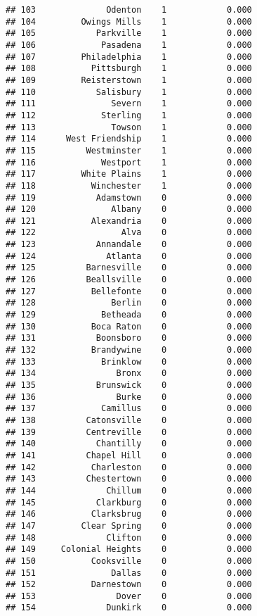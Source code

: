 \documentclass[]{article}
\begin{document}
\begin{verbatim}
## 103              Odenton    1            0.000
## 104         Owings Mills    1            0.000
## 105            Parkville    1            0.000
## 106             Pasadena    1            0.000
## 107         Philadelphia    1            0.000
## 108           Pittsburgh    1            0.000
## 109         Reisterstown    1            0.000
## 110            Salisbury    1            0.000
## 111               Severn    1            0.000
## 112             Sterling    1            0.000
## 113               Towson    1            0.000
## 114      West Friendship    1            0.000
## 115          Westminster    1            0.000
## 116             Westport    1            0.000
## 117         White Plains    1            0.000
## 118           Winchester    1            0.000
## 119            Adamstown    0            0.000
## 120               Albany    0            0.000
## 121           Alexandria    0            0.000
## 122                 Alva    0            0.000
## 123            Annandale    0            0.000
## 124              Atlanta    0            0.000
## 125          Barnesville    0            0.000
## 126          Beallsville    0            0.000
## 127           Bellefonte    0            0.000
## 128               Berlin    0            0.000
## 129             Betheada    0            0.000
## 130           Boca Raton    0            0.000
## 131            Boonsboro    0            0.000
## 132           Brandywine    0            0.000
## 133             Brinklow    0            0.000
## 134                Bronx    0            0.000
## 135            Brunswick    0            0.000
## 136                Burke    0            0.000
## 137             Camillus    0            0.000
## 138          Catonsville    0            0.000
## 139          Centreville    0            0.000
## 140            Chantilly    0            0.000
## 141          Chapel Hill    0            0.000
## 142           Charleston    0            0.000
## 143          Chestertown    0            0.000
## 144              Chillum    0            0.000
## 145            Clarkburg    0            0.000
## 146           Clarksbrug    0            0.000
## 147         Clear Spring    0            0.000
## 148              Clifton    0            0.000
## 149     Colonial Heights    0            0.000
## 150           Cooksville    0            0.000
## 151               Dallas    0            0.000
## 152           Darnestown    0            0.000
## 153                Dover    0            0.000
## 154              Dunkirk    0            0.000

\end{verbatim}
\end{document}
